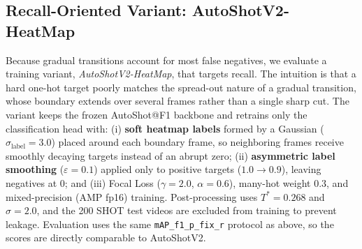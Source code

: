 \subsection{Recall-Oriented Variant: AutoShotV2-HeatMap}
\label{sec:heatmap_variant}

Because gradual transitions account for most false negatives, we evaluate a
training variant, \emph{AutoShotV2-HeatMap}, that targets recall. The intuition
is that a hard one-hot target poorly matches the spread-out nature of a gradual
transition, whose boundary extends over several frames rather than a single
sharp cut. The variant keeps the frozen AutoShot@F1 backbone and retrains only
the classification head with: (i) \textbf{soft heatmap labels} formed by a
Gaussian ($\sigma_{\text{label}} = 3.0$) placed around each boundary frame, so
neighboring frames receive smoothly decaying targets instead of an abrupt zero;
(ii) \textbf{asymmetric label smoothing} ($\varepsilon = 0.1$) applied only to
positive targets ($1.0 \rightarrow 0.9$), leaving negatives at $0$; and
(iii) Focal Loss ($\gamma = 2.0$, $\alpha = 0.6$), many-hot weight $0.3$, and
mixed-precision (AMP fp16) training. Post-processing uses $T^{*} = 0.268$ and
$\sigma = 2.0$, and the 200 SHOT test videos are excluded from training to
prevent leakage. Evaluation uses the same \texttt{mAP\_f1\_p\_fix\_r} protocol
as above, so the scores are directly comparable to AutoShotV2.

\begin{table}[!t]
\caption{AutoShotV2-HeatMap Versus AutoShotV2 (Recall-Oriented Operating Point)}
\label{tab:heatmap_variant}
\centering
\small
\renewcommand{\arraystretch}{1.08}
\vspace{0.5ex}
\end{table}

